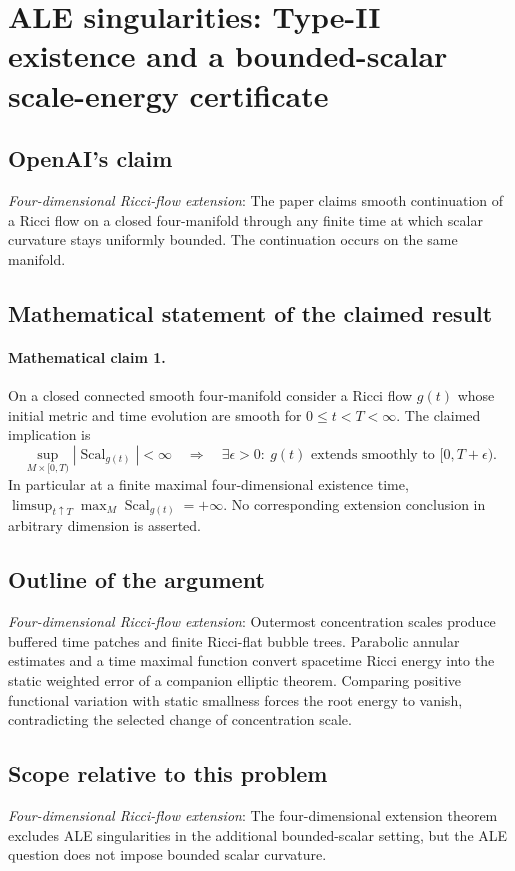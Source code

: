 \documentclass[11pt]{article}
\begin{document}
\section*{ALE singularities: Type-II existence and a bounded-scalar scale-energy certificate}

\subsection{OpenAI's claim}
\textit{Four-dimensional Ricci-flow extension}: The paper claims smooth continuation of a Ricci flow on a closed four-manifold through any finite time at which scalar curvature stays uniformly bounded. The continuation occurs on the same manifold.

\subsection{Mathematical statement of the claimed result}
\paragraph{Mathematical claim 1.} On a closed connected smooth four-manifold consider a Ricci flow $g(t)$ whose initial metric and time evolution are smooth for $0\le t<T<\infty$. The claimed implication is \[\sup_{M\times[0,T)}|\operatorname{Scal}_{g(t)}|<\infty\quad\Longrightarrow\quad\exists\epsilon>0:\ g(t)\text{ extends smoothly to }[0,T+\epsilon).\] In particular at a finite maximal four-dimensional existence time, $\limsup_{t\uparrow T}\max_M\operatorname{Scal}_{g(t)}=+\infty$. No corresponding extension conclusion in arbitrary dimension is asserted.

\subsection{Outline of the argument}
\textit{Four-dimensional Ricci-flow extension}: Outermost concentration scales produce buffered time patches and finite Ricci-flat bubble trees. Parabolic annular estimates and a time maximal function convert spacetime Ricci energy into the static weighted error of a companion elliptic theorem. Comparing positive functional variation with static smallness forces the root energy to vanish, contradicting the selected change of concentration scale.

\subsection{Scope relative to this problem}
\textit{Four-dimensional Ricci-flow extension}: The four-dimensional extension theorem excludes ALE singularities in the additional bounded-scalar setting, but the ALE question does not impose bounded scalar curvature.
\end{document}
